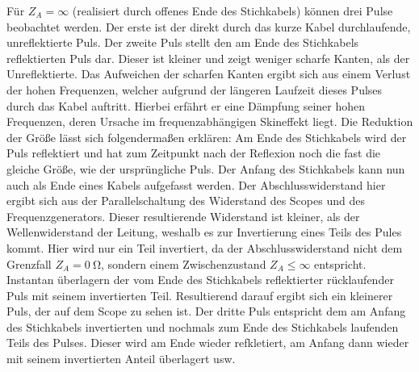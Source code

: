 \documentclass[a4paper,twoside,final]{article}
\begin{document}
Für $Z_A = \infty$ (realisiert durch offenes Ende des Stichkabels) können drei Pulse beobachtet werden. Der erste ist der direkt durch das kurze Kabel durchlaufende, unreflektierte Puls. Der zweite Puls stellt den am Ende des Stichkabels reflektierten Puls dar. Dieser ist kleiner und zeigt weniger scharfe Kanten, als der Unreflektierte. Das Aufweichen der scharfen Kanten ergibt sich aus einem Verlust der hohen Frequenzen, welcher aufgrund der längeren Laufzeit dieses Pulses durch das Kabel auftritt. Hierbei erfährt er eine Dämpfung seiner hohen Frequenzen, deren Ursache im frequenzabhängigen Skineffekt liegt. Die Reduktion der Größe lässt sich folgendermaßen erklären: Am Ende des Stichkabels wird der Puls reflektiert und hat zum Zeitpunkt nach der Reflexion noch die fast die gleiche Größe, wie der ursprüngliche Puls. Der Anfang des Stichkabels kann nun auch als Ende eines Kabels aufgefasst werden. Der Abschlusswiderstand hier ergibt sich aus der Parallelschaltung des Widerstand des Scopes und des Frequenzgenerators. Dieser resultierende Widerstand ist kleiner, als der Wellenwiderstand der Leitung, weshalb es zur Invertierung eines Teils des Pules kommt. Hier wird nur ein Teil invertiert, da der Abschlusswiderstand nicht dem Grenzfall $Z_A = \SI{0}{\ohm}$, sondern einem Zwischenzustand $Z_A \leq \infty$ entspricht. Instantan überlagern der vom Ende des Stichkabels reflektierter rücklaufender Puls mit seinem invertierten Teil. Resultierend darauf ergibt sich ein kleinerer Puls, der auf dem Scope zu sehen ist. Der dritte Puls entspricht dem am Anfang des Stichkabels invertierten und nochmals zum Ende des Stichkabels laufenden Teils des Pulses. Dieser wird am Ende wieder refkletiert, am Anfang dann wieder mit seinem invertierten Anteil überlagert usw.
\end{document}
